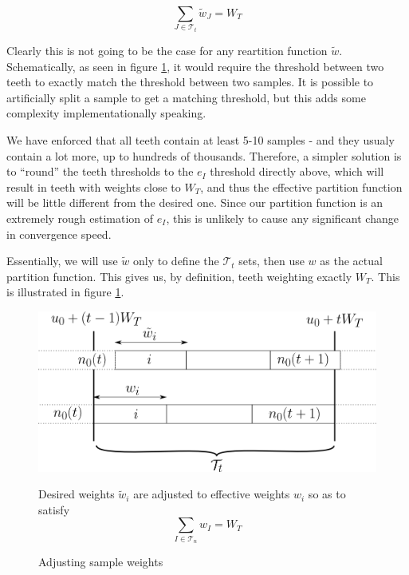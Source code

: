 \documentclass[./thesis.tex]{subfiles}
\begin{document}
\begin{equation}
\sum_{J \in \mathcal{T}_t} \tilde w_J = W_T
\end{equation}

Clearly this is not going to be the case for any reartition function $\tilde w$. Schematically, as seen in figure \ref{fig:toothbuilding}, it would require the threshold between two teeth to exactly match the threshold between two samples. It is possible to artificially split a sample to get a matching threshold, but this adds some complexity implementationally speaking.

We have enforced that all teeth contain at least 5-10 samples - and they usualy contain a lot more, up to hundreds of thousands. Therefore, a simpler solution is to ``round'' the teeth thresholds to the $e_I$ threshold directly above, which will result in teeth with weights close to $W_T$, and thus the effective partition function will be little different from the desired one. Since our partition function is an extremely rough estimation of $e_I$, this is unlikely to cause any significant change in convergence speed.

Essentially, we will use $\tilde w$ only to define the $\mathcal{T}_t$ sets, then use $w$ as the actual partition function. This gives us, by definition, teeth weighting exactly $W_T$.
This is illustrated in figure \ref{fig:toothbuilding}.
 
 \begin{figure}[h!]
	\begin{center}
		\includegraphics[width=0.9\columnwidth]{figures/pt2/toothbuilding}
		\caption{Adjusting sample weights}
		\label{fig:toothbuilding}
		 Desired weights $\tilde w_i$ are adjusted to effective weights $w_i$ so as to satisfy
		 $$\sum_{I \in \mathcal{T}_n} w_I = W_T$$
	\end{center}
\end{figure}
\end{document}
